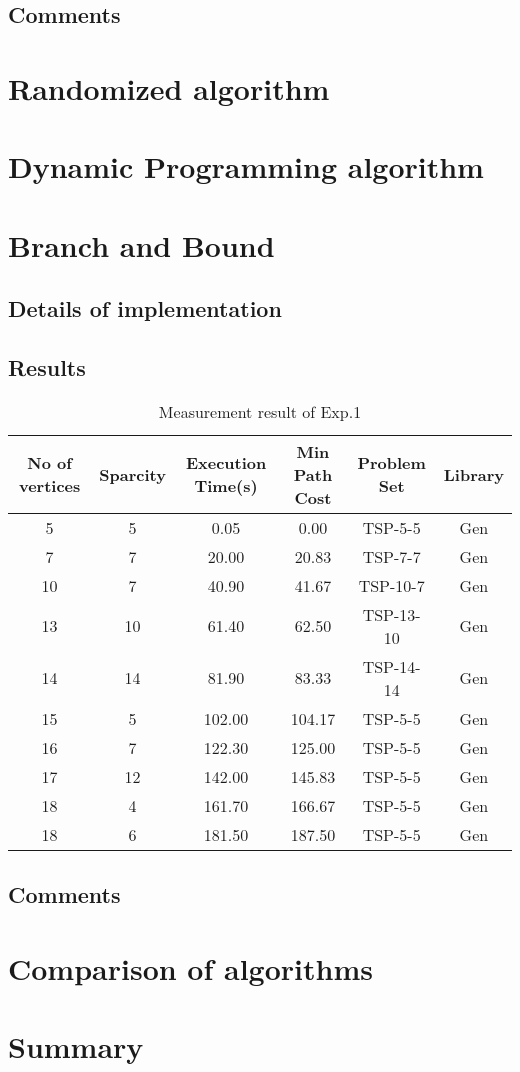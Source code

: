 \documentclass[a4paper, 11pt]{article}
\begin{document}
\subsection{Comments}
\pagebreak

\section{Randomized algorithm}


\section{Dynamic Programming algorithm}


\section{Branch and Bound}

\subsection{Details of implementation}

\subsection{Results}

\begin{table}[!h]
\centering
\begin{tabular}{|c|c|c|c|c|c|}
	\hline
	No of vertices & Sparcity  & Execution Time(s) & Min Path Cost & Problem Set & Library  \\
	\hline\hline
	5 & 5 & 0.05 & 0.00 & TSP-5-5 & Gen\\
	\hline
	7 & 7 & 20.00 &20.83& TSP-7-7 & Gen\\
	\hline
	10 & 7 & 40.90 &41.67& TSP-10-7 & Gen\\
	\hline
	13 & 10 & 61.40 &62.50& TSP-13-10 & Gen\\
	\hline
	14 & 14 & 81.90 &83.33& TSP-14-14 & Gen\\
	\hline
	15 & 5 & 102.00 &104.17& TSP-5-5 & Gen\\
	\hline
	16 & 7 & 122.30 &125.00& TSP-5-5 & Gen\\
	\hline
	17 & 12 & 142.00 &145.83& TSP-5-5 & Gen\\
	\hline
	18 & 4 & 161.70 &166.67& TSP-5-5 & Gen\\
	\hline
	18 & 6 & 181.50 &187.50& TSP-5-5 & Gen\\
	\hline
\end{tabular}
\caption{Measurement result of Exp.1}
\label{t1}
\end{table}


\subsection{Comments}
\pagebreak
\section{Comparison of algorithms}

\section{Summary}
\end{document}

